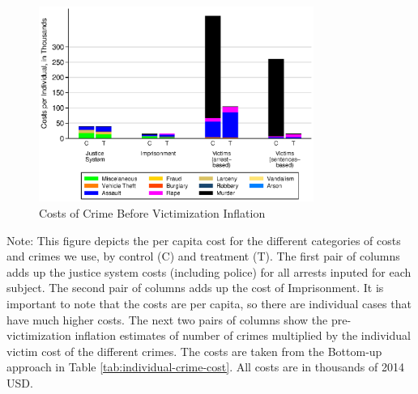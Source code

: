 \documentclass[static]{JJH-Beamer}
\begin{document}
\begin{frame}

\begin{figure} [H]
\caption{Costs of Crime Before Victimization Inflation}\label{tab:diff-costs}
\begin{center}
\includegraphics[width=0.8\textwidth]{AppOutput/Crime/different_costs}
\end{center}
\end{figure}

\end{frame}

{\flushleft \normalsize Note: This figure depicts the per capita cost for the different categories of costs and crimes we use, by control (C) and treatment (T). The first pair of columns adds up the justice system costs (including police) for all arrests inputed for each subject. The second pair of columns adds up the cost of Imprisonment. It is important to note that the costs are per capita, so there are individual cases that have much higher costs. The next two pairs of columns show the pre-victimization inflation estimates of number of crimes multiplied by the individual victim cost of the different crimes. The costs are taken from the Bottom-up approach in Table \ref{tab:individual-crime-cost}. All costs are in thousands of 2014 USD.\\}
\end{document}
